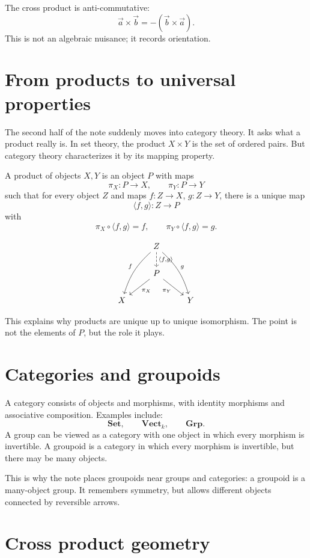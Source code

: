 The cross product is anti-commutative:
\[
  \vec a\times\vec b=-(\vec b\times\vec a).
\]
This is not an algebraic nuisance; it records orientation.

\section{From products to universal properties}

The second half of the note suddenly moves into category theory.  It asks what a product really is.  In set theory, the product \(X\times Y\) is the set of ordered pairs.  But category theory characterizes it by its mapping property.

A product of objects \(X,Y\) is an object \(P\) with maps
\[
  \pi_X:P\to X,\qquad \pi_Y:P\to Y
\]
such that for every object \(Z\) and maps \(f:Z\to X\), \(g:Z\to Y\), there is a unique map
\[
  \langle f,g\rangle:Z\to P
\]
with
\[
  \pi_X\circ\langle f,g\rangle=f,\qquad
  \pi_Y\circ\langle f,g\rangle=g.
\]

\[
\begin{tikzcd}
& Z \arrow[ddl,bend right=15,swap,"f"] \arrow[ddr,bend left=15,"g"] \arrow[d,dashed,"{\langle f,g\rangle}"] & \\
& P \arrow[dl,"\pi_X"] \arrow[dr,swap,"\pi_Y"] & \\
X && Y
\end{tikzcd}
\]

This explains why products are unique up to unique isomorphism.  The point is not the elements of \(P\), but the role it plays.

\section{Categories and groupoids}

A category consists of objects and morphisms, with identity morphisms and associative composition.  Examples include:
\[
  \mathbf{Set},\qquad \mathbf{Vect}_k,\qquad \mathbf{Grp}.
\]
A group can be viewed as a category with one object in which every morphism is invertible.  A groupoid is a category in which every morphism is invertible, but there may be many objects.

This is why the note places groupoids near groups and categories: a groupoid is a many-object group.  It remembers symmetry, but allows different objects connected by reversible arrows.


\section{Cross product geometry}

